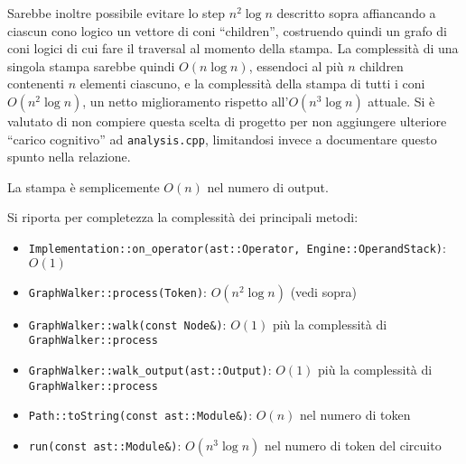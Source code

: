 \documentclass[12pt]{article}
\begin{document}
Sarebbe inoltre possibile evitare lo step \(n^2 \log n\) descritto sopra
affiancando a ciascun cono logico un vettore di coni ``children'',
costruendo quindi un grafo di coni logici di cui fare il traversal al
momento della stampa. La complessità di una singola stampa sarebbe
quindi \(O(n \log n)\), essendoci al più \(n\) children contenenti \(n\)
elementi ciascuno, e la complessità della stampa di tutti i coni
\(O(n^2 \log n)\), un netto miglioramento rispetto all'\(O(n^3 \log n)\)
attuale. Si è valutato di non compiere questa scelta di progetto per non
aggiungere ulteriore ``carico cognitivo'' ad \texttt{analysis.cpp},
limitandosi invece a documentare questo spunto nella relazione.

La stampa è semplicemente \(O(n)\) nel numero di output.

Si riporta per completezza la complessità dei principali metodi:

\begin{itemize}
\item
  \texttt{Implementation::on\_operator(ast::Operator,\ Engine::OperandStack)}:
  \(O(1)\)
\item
  \texttt{GraphWalker::process(Token)}: \(O(n^2 \log n)\) (vedi sopra)
\item
  \texttt{GraphWalker::walk(const\ Node\&)}: \(O(1)\) più la complessità
  di \texttt{GraphWalker::process}
\item
  \texttt{GraphWalker::walk\_output(ast::Output)}: \(O(1)\) più la
  complessità di \texttt{GraphWalker::process}
\item
  \texttt{Path::toString(const\ ast::Module\&)}: \(O(n)\) nel numero di
  token
\item
  \texttt{run(const\ ast::Module\&)}: \(O(n^3 \log n)\) nel numero di
  token del circuito
\end{itemize}
\end{document}
